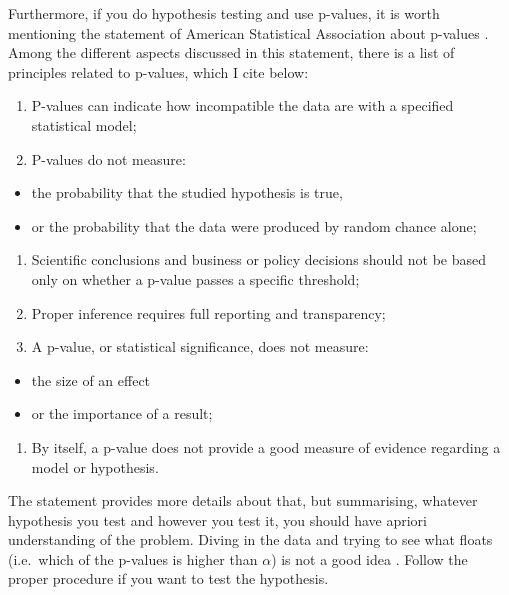 \documentclass[
]{book}
\providecommand{\tightlist}{%
  \setlength{\itemsep}{0pt}\setlength{\parskip}{0pt}}
\theoremstyle{definition}
\theoremstyle{definition}
\theoremstyle{definition}
\theoremstyle{definition}
\theoremstyle{remark}
\begin{document}
Furthermore, if you do hypothesis testing and use p-values, it is worth mentioning the statement of American Statistical Association about p-values \citep{Wasserstein2016}. Among the different aspects discussed in this statement, there is a list of principles related to p-values, which I cite below:

\begin{enumerate}
\def\labelenumi{\arabic{enumi}.}
\tightlist
\item
  P-values can indicate how incompatible the data are with a specified statistical model;
\item
  P-values do not measure:
\end{enumerate}

\begin{itemize}
\tightlist
\item
  the probability that the studied hypothesis is true,
\item
  or the probability that the data were produced by random chance alone;
\end{itemize}

\begin{enumerate}
\def\labelenumi{\arabic{enumi}.}
\setcounter{enumi}{2}
\tightlist
\item
  Scientific conclusions and business or policy decisions should not be based only on whether a p-value passes a specific threshold;
\item
  Proper inference requires full reporting and transparency;
\item
  A p-value, or statistical significance, does not measure:
\end{enumerate}

\begin{itemize}
\tightlist
\item
  the size of an effect
\item
  or the importance of a result;
\end{itemize}

\begin{enumerate}
\def\labelenumi{\arabic{enumi}.}
\setcounter{enumi}{5}
\tightlist
\item
  By itself, a p-value does not provide a good measure of evidence regarding a model or hypothesis.
\end{enumerate}

The statement provides more details about that, but summarising, whatever hypothesis you test and however you test it, you should have apriori understanding of the problem. Diving in the data and trying to see what floats (i.e.~which of the p-values is higher than \(\alpha\)) is not a good idea \citep{Wasserstein2016}. Follow the proper procedure if you want to test the hypothesis.
\end{document}
